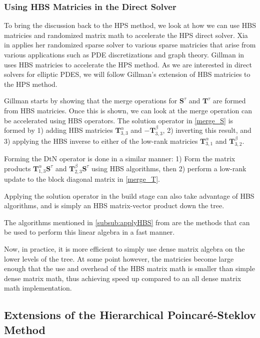 \subsubsection{Using HBS Matricies in the Direct Solver}

To bring the discussion back to the HPS method, we look at how we can use HBS matricies and randomized matrix math to accelerate the HPS direct solver. Xia in \cite{xia2013randomized} applies her randomized sparse solver to various sparse matricies that arise from various applications such as PDE discretizations and graph theory. Gillman in \cite{gillman2014direct} uses HBS matricies to accelerate the HPS method. As we are interested in direct solvers for elliptic PDES, we will follow Gillman's extension of HBS matricies to the HPS method.

Gillman starts by showing that the merge operations for $\textbf{S}^{\tau}$ and $\textbf{T}^{\tau}$ are formed from HBS matricies. Once this is shown, we can look at the merge operation can be accelerated using HBS operators. The solution operator in \ref{merge_S} is formed by 1) adding HBS matricies $\textbf{T}_{3,3}^{\alpha}$ and $-\textbf{T}_{3,3}^{\beta}$, 2) inverting this result, and 3) applying the HBS inverse to either of the low-rank matricies $\textbf{T}_{3,1}^{\alpha}$ and $\textbf{T}_{3,2}^{\beta}$.

Forming the DtN operator is done in a similar manner: 1) Form the matrix products $\textbf{T}_{1,3}^{\alpha} \textbf{S}^{\tau}$ and $\textbf{T}_{2,3}^{\beta} \textbf{S}^{\tau}$ using HBS algorithms, then 2) perform a low-rank update to the block diagonal matrix in \ref{merge_T}.

Applying the solution operator in the build stage can also take advantage of HBS algorithms, and is simply an HBS matrix-vector product down the tree.

The algorithms mentioned in \ref{subsub:applyHBS} from \cite{gillman2012direct} are the methods that can be used to perform this linear algebra in a fast manner.

Now, in practice, it is more efficient to simply use dense matrix algebra on the lower levels of the tree. At some point however, the matricies become large enough that the use and overhead of the HBS matrix math is smaller than simple dense matrix math, thus achieving speed up compared to an all dense matrix math implementation.

\subsection{Extensions of the Hierarchical Poincaré-Steklov Method}

